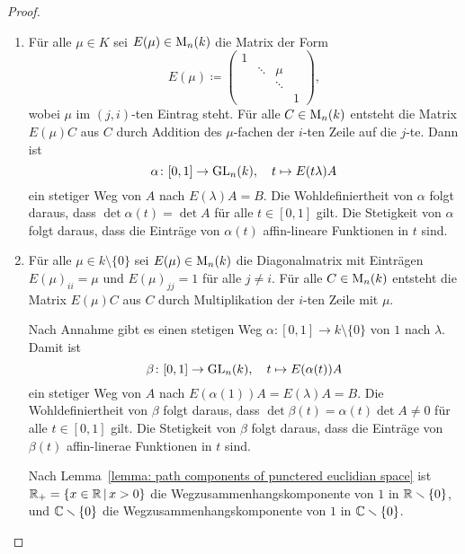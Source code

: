 \begin{proof}
  \begin{enumerate}[label = \alph*)]
    \item
      Für alle $\mu \in K$ sei $E(\mu) \in \operatorname{M}_{n}(k)$ die Matrix der Form
      \[
                  E(\mu)
        \coloneqq \begin{pmatrix}
                    1 &         &         &   \\
                      & \ddots  & \mu     &   \\
                      &         & \ddots  &   \\
                      &         &         & 1
                  \end{pmatrix},
      \]
      wobei $\mu$ im $(j,i)$-ten Eintrag steht.
      Für alle $C \in \operatorname{M}_{n}(k)$ entsteht die Matrix $E(\mu) C$ aus $C$ durch Addition des $\mu$-fachen der $i$-ten Zeile auf die $j$-te.
      Dann ist
      \[
                \alpha
        \colon  [0,1] \to \operatorname{GL}_{n}(k),
        \quad   t
        \mapsto E(t\lambda) A
      \]
      ein stetiger Weg von $A$ nach $E(\lambda) A = B$.
      Die Wohldefiniertheit von $\alpha$ folgt daraus, dass $\det \alpha(t) = \det A$ für alle $t \in [0,1]$ gilt.
      Die Stetigkeit von $\alpha$ folgt daraus, dass die Einträge von $\alpha(t)$ affin-lineare Funktionen in $t$ sind.
      
    \item
      Für alle $\mu \in k \setminus \{0\}$ sei $E(\mu) \in \operatorname{M}_{n}(k)$ die Diagonalmatrix mit Einträgen $E(\mu)_{ii} = \mu$ und $E(\mu)_{jj} = 1$ für alle $j \neq i$.
      Für alle $C \in \operatorname{M}_{n}(k)$ entsteht die Matrix $E(\mu) C$ aus $C$ durch Multiplikation der $i$-ten Zeile mit $\mu$.
      
      Nach Annahme gibt es einen stetigen Weg $\alpha \colon [0,1] \to k \setminus \{0\}$ von $1$ nach $\lambda$.
      Damit ist
      \[
                \beta
        \colon  [0,1] \to \operatorname{GL}_{n}(k),
        \quad   t
        \mapsto E(\alpha(t)) A
      \]
      ein stetiger Weg von $A$ nach $E(\alpha(1)) A = E(\lambda) A = B$.
      Die Wohldefiniertheit von $\beta$ folgt daraus, dass $\det \beta(t) = \alpha(t) \det A \neq 0$ für alle $t \in [0,1]$ gilt.
      Die Stetigkeit von $\beta$ folgt daraus, dass die Einträge von $\beta(t)$ affin-linerae Funktionen in $t$ sind.
      
      Nach Lemma~\ref{lemma: path components of punctered euclidian space} ist $\mathbb{R}_+ = \{x \in \mathbb{R} \,|\, x > 0\}$ die Wegzusammenhangskomponente von $1$ in $\mathbb{R} \smallsetminus \{0\}$, und $\mathbb{C} \smallsetminus \{0\}$ die Wegzusammenhangskomponente von $1$ in $\mathbb{C} \smallsetminus \{0\}$.
    

\end{enumerate}
\end{proof}
